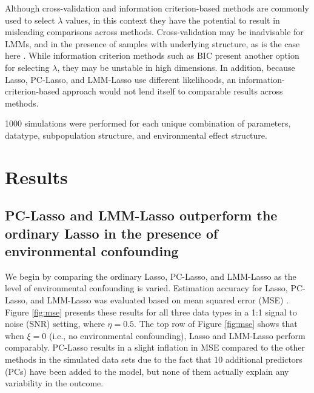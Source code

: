 Although cross-validation and information criterion-based methods are commonly used to select $\lambda$ values, in this context they have the potential to result in misleading comparisons across methods. Cross-validation may be inadvisable for LMMs, and in the presence of samples with underlying structure, as is the case here \citep{roberts2017cross}. While information criterion methods such as BIC present another option for selecting $\lambda$, they may be unstable in high dimensions. In addition, because Lasso, PC-Lasso, and LMM-Lasso use different likelihoods, an information-criterion-based approach would not lend itself to comparable results across methods. 

1000 simulations were performed for each unique combination of parameters, datatype, subpopulation structure, and environmental effect structure. 


\section{Results} \label{sec:results}

\subsection{PC-Lasso and LMM-Lasso outperform the ordinary Lasso in the presence of environmental confounding}

We begin by comparing the ordinary Lasso, PC-Lasso, and LMM-Lasso as the level of environmental confounding is varied. Estimation accuracy for Lasso, PC-Lasso, and LMM-Lasso was evaluated based on mean squared error (MSE) . Figure \ref{fig:mse} presents these results for all three data types in a 1:1 signal to noise (SNR) setting, where $\eta = 0.5$. The top row of Figure \ref{fig:mse} shows that when $\xi = 0$ (i.e., no environmental confounding), Lasso and LMM-Lasso perform comparably. PC-Lasso results in a slight inflation in MSE compared to the other methods in the simulated data sets due to the fact that 10 additional predictors (PCs) have been added to the model, but none of them actually explain any variability in the outcome. 

